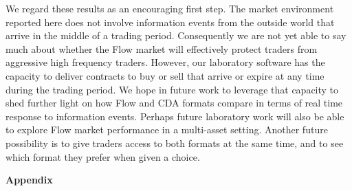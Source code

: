\documentclass[12pt]{article}
\begin{document}
We regard these results as an encouraging first step.
The market environment reported here 
does not involve information events from the outside world that arrive 
in the middle of a trading period.
Consequently we are not yet able to say much about whether 
the Flow market will effectively protect traders from aggressive high frequency traders. 
However, our laboratory software has the capacity to deliver contracts to buy or sell that arrive or expire at any time during the trading period.
We hope in future work to leverage that capacity to shed further light on how Flow and CDA formats compare in terms of real time response to information events.
Perhaps future laboratory work will also be able to explore Flow market performance in a multi-asset setting.
Another future possibility is to give traders access to both formats at the same time, and to see which format they prefer when given a choice.










\pagebreak
\begin{singlespace}



\pagebreak
\end{singlespace}
\clearpage


\begin{singlespace}
\appendix
\setcounter{page}{1}
\begin{center}
    \huge \textbf{Appendix}
    
\end{center}


%
%
% 

\end{singlespace}
\end{document}
